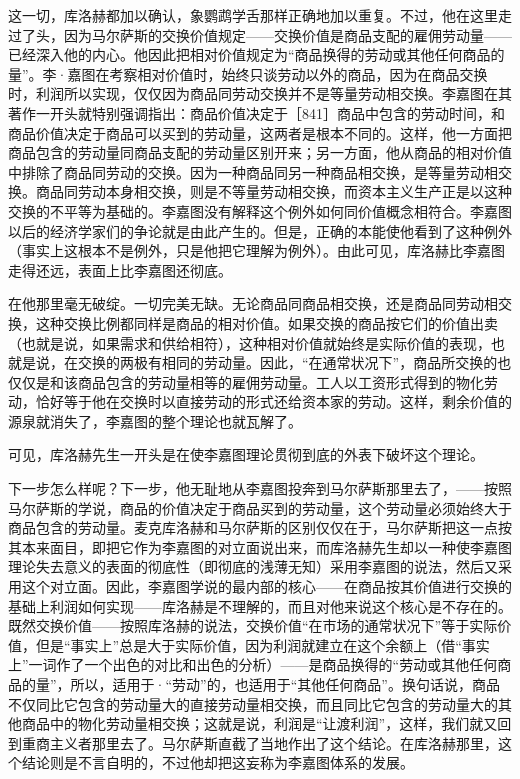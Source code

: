 这一切，库洛赫都加以确认，象鹦鹉学舌那样正确地加以重复。不过，他在这里走过了头，因为马尔萨斯的交换价值规定——交换价值是商品支配的雇佣劳动量——已经深入他的内心。他因此把相对价值规定为“商品换得的劳动或其他任何商品的量”。李·嘉图在考察相对价值时，始终只谈劳动以外的商品，因为在商品交换时，利润所以实现，仅仅因为商品同劳动交换并不是等量劳动相交换。李嘉图在其著作一开头就特别强调指出：商品价值决定于［841］商品中包含的劳动时间，和商品价值决定于商品可以买到的劳动量，这两者是根本不同的。这样，他一方面把商品包含的劳动量同商品支配的劳动量区别开来；另一方面，他从商品的相对价值中排除了商品同劳动的交换。因为一种商品同另一种商品相交换，是等量劳动相交换。商品同劳动本身相交换，则是不等量劳动相交换，而资本主义生产正是以这种交换的不平等为基础的。李嘉图没有解释这个例外如何同价值概念相符合。李嘉图以后的经济学家们的争论就是由此产生的。但是，正确的本能使他看到了这种例外（事实上这根本不是例外，只是他把它理解为例外）。由此可见，库洛赫比李嘉图走得还远，表面上比李嘉图还彻底。

在他那里毫无破绽。一切完美无缺。无论商品同商品相交换，还是商品同劳动相交换，这种交换比例都同样是商品的相对价值。如果交换的商品按它们的价值出卖（也就是说，如果需求和供给相符），这种相对价值就始终是实际价值的表现，也就是说，在交换的两极有相同的劳动量。因此，“在通常状况下”，商品所交换的也仅仅是和该商品包含的劳动量相等的雇佣劳动量。工人以工资形式得到的物化劳动，恰好等于他在交换时以直接劳动的形式还给资本家的劳动。这样，剩余价值的源泉就消失了，李嘉图的整个理论也就瓦解了。

可见，库洛赫先生一开头是在使李嘉图理论贯彻到底的外表下破坏这个理论。

下一步怎么样呢？下一步，他无耻地从李嘉图投奔到马尔萨斯那里去了，——按照马尔萨斯的学说，商品的价值决定于商品买到的劳动量，这个劳动量必须始终大于商品包含的劳动量。麦克库洛赫和马尔萨斯的区别仅仅在于，马尔萨斯把这一点按其本来面目，即把它作为李嘉图的对立面说出来，而库洛赫先生却以一种使李嘉图理论失去意义的表面的彻底性（即彻底的浅薄无知）采用李嘉图的说法，然后又采用这个对立面。因此，李嘉图学说的最内部的核心——在商品按其价值进行交换的基础上利润如何实现——库洛赫是不理解的，而且对他来说这个核心是不存在的。既然交换价值——按照库洛赫的说法，交换价值“在市场的通常状况下”等于实际价值，但是“事实上”总是大于实际价值，因为利润就建立在这个余额上（借“事实上”一词作了一个出色的对比和出色的分析）——是商品换得的“劳动或其他任何商品的量”，所以，适用于·“劳动”的，也适用于“其他任何商品”。换句话说，商品不仅同比它包含的劳动量大的直接劳动量相交换，而且同比它包含的劳动量大的其他商品中的物化劳动量相交换；这就是说，利润是“让渡利润”，这样，我们就又回到重商主义者那里去了。马尔萨斯直截了当地作出了这个结论。在库洛赫那里，这个结论则是不言自明的，不过他却把这妄称为李嘉图体系的发展。

